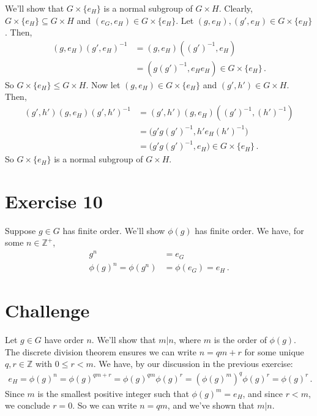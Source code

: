 \documentclass{article}
\begin{document}
We'll show that $G \times \{e_H\}$
is a normal subgroup of $G \times H$.
Clearly, $G \times \{e_H\} \subseteq G \times H$ and
$(e_G, e_H) \in G \times \{e_H\}$.
Let $(g, e_H), (g', e_H) \in G \times \{e_H\}$. Then,
\begin{align*}
    (g, e_H) (g', e_H)^{-1} &= (g, e_H) ((g')^{-1}, e_H) \\
    &= (g(g')^{-1}, e_H e_H) \in G \times \{e_H\} \,.
\end{align*}
So $G \times \{e_H\} \leq G \times H$.
Now let $(g, e_H) \in G \times \{e_H\}$ and $(g', h') \in G \times H$.
Then,
\begin{align*}
    (g', h') (g, e_H) (g', h')^{-1} &= (g', h')(g, e_H)((g')^{-1}, (h')^{-1}) \\
    &= \bigl(g'g(g')^{-1}, h'e_H(h')^{-1}\bigr) \\
    &= \bigl(g'g(g')^{-1}, e_H\bigr) \in G \times \{e_H\} \,.
\end{align*}
So $G \times \{e_H\}$ is a normal subgroup of $G \times H$.
\qedsymbol

\section*{Exercise 10}

Suppose $g \in G$ has finite order.
We'll show $\phi(g)$ has finite order. We have, for some $n \in \mathbb{Z}^+$,
\begin{align*}
    g^n  &= e_G \\
    \phi(g)^n = \phi(g^n) &= \phi(e_G) = e_H \,.
\end{align*}
\qedsymbol

\section*{Challenge}

Let $g \in G$ have order $n$.
We'll show that $m|n$, where $m$ is the order of $\phi(g)$.
The discrete division theorem ensures we can write
$n = qm + r$
for some unique $q, r \in \mathbb{Z}$ with $0 \leq r < m$.
We have, by our discussion in the previous exercise:
\begin{gather*}
    e_H = \phi(g)^n = \phi(g)^{qm+r} = \phi(g)^{qm} \phi(g)^r = (\phi(g)^m)^q \phi(g)^r = \phi(g)^r \,.
\end{gather*}
Since $m$ is the smallest positive integer such that $\phi(g)^m = e_H$,
and since $r < m$, we conclude $r = 0$.
So we can write $n = qm$, and we've shown that $m|n$.
\qedsymbol
\end{document}
